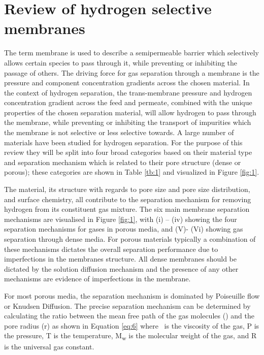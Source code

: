 \section{Review of hydrogen selective membranes}
The term membrane is used to describe a semipermeable barrier which selectively allows certain species to 
pass through it, while preventing or inhibiting the passage of others. The driving force for gas separation 
through a membrane is the pressure and component concentration gradients across the chosen material. 
In the context of hydrogen separation, the trans-membrane pressure and hydrogen concentration gradient 
across the feed and permeate, combined with the unique properties of the chosen separation material, 
will allow hydrogen to pass through the membrane, while preventing or inhibiting the transport of impurities 
which the membrane is not selective or less selective towards. A large number of materials have been studied 
for hydrogen separation. For the purpose of this review they will be split into four broad categories based 
on their material type and separation mechanism which is related to their pore structure (dense or porous); 
these categories are shown in Table \ref{tb:1} and visualized in Figure \ref{fig:1}.

The material, its structure with regards to pore size and pore size distribution, and surface chemistry, 
all contribute to the separation mechanism for removing hydrogen from its constituent gas mixture. 
The six main membrane separation mechanisms are visualised in Figure \ref{fig:1}, with (i) – (iv) showing the 
four separation mechanisms for gases in porous media, and (V)- (Vi) showing gas separation through dense media. 
For porous materials typically a combination of these mechanisms dictates the overall separation performance 
due to imperfections in the membranes structure. All dense membranes should be dictated by the solution 
diffusion mechanism and the presence of any other mechanisms are evidence of imperfections in the membrane. 

For most porous media, the separation mechanism is dominated by Poiseuille flow or Knudsen Diffusion. 
The precise separation mechanism can be determined by calculating the ratio between the mean free path of 
the gas molecules (\textlambda) and the pore radius (r) as shown in Equation \ref{eq:6} where \texteta \ is the viscosity of the gas, 
P is the pressure, T is the temperature, M\textsubscript{w} is the molecular weight of the gas, and R is the universal gas 
constant.


